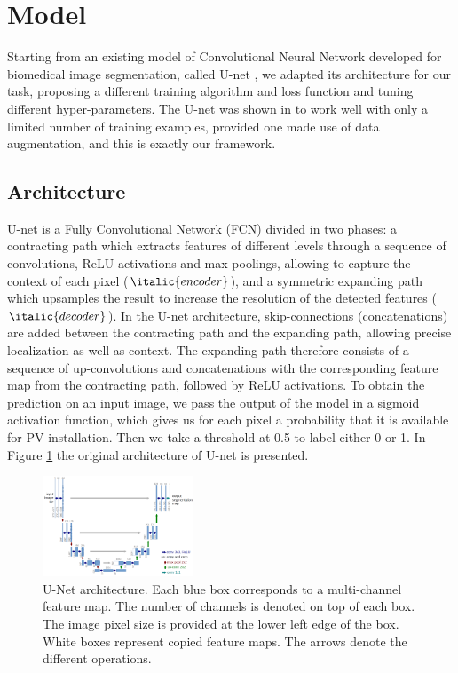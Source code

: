 \documentclass[9pt,conference,compsocconf]{IEEEtran}
\begin{document}
\section{Model}
\label{sec:models}

Starting from an existing model of Convolutional Neural Network developed for biomedical image segmentation, called U-net \cite{ronneberger2015u}, we adapted its architecture for our task, proposing a different training algorithm and loss function and tuning different hyper-parameters. The U-net was shown in \cite{ronneberger2015u} to work well with only a limited number of training examples, provided one made use of data augmentation, and this is exactly our framework.

\subsection{Architecture}
\label{subsec:architecture}
U-net is a Fully Convolutional Network (FCN) divided in two phases: a contracting path which extracts features of different levels through a sequence of convolutions, ReLU activations and max poolings, allowing to capture the context of each pixel ($\italic{encoder}$), and a symmetric expanding path which upsamples the result to increase the resolution of the detected features ($\italic{decoder}$). In the U-net architecture, skip-connections (concatenations) are added between the contracting path and the expanding path, allowing precise localization as well as context. The expanding path therefore consists of a sequence of up-convolutions and concatenations with the corresponding feature map from the contracting path, followed by ReLU activations. To obtain the prediction on an input image, we pass the output of the model in a sigmoid activation function, which gives us for each pixel a probability that it is available for PV installation. Then we take a threshold at 0.5 to label either 0 or 1. 
In Figure \ref{fig:u_net} the original architecture of U-net is presented.

\begin{figure}[h]
    \centering
    \includegraphics[width=0.4\textwidth]{figures/u_net.png}
    \caption{\footnotesize{U-Net architecture. Each blue box corresponds to a multi-channel feature map. The number of channels is denoted on top of each box. The image pixel size is provided at the lower left edge of the box. White boxes represent copied feature maps. The arrows denote the different operations.}}
    \label{fig:u_net}
\end{figure}
\end{document}
